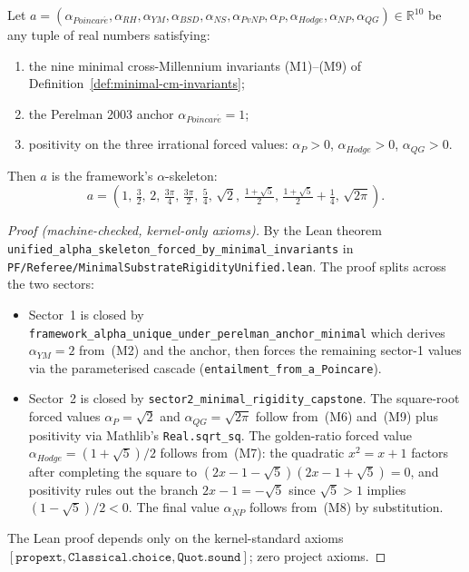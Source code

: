 \begin{theorem}
\label{thm:minimal-substrate-rigidity}
Let $a = (\alpha_{Poincar\acute{e}}, \alpha_{RH}, \alpha_{YM},
\alpha_{BSD}, \alpha_{NS}, \alpha_{PvNP}, \alpha_{P}, \alpha_{Hodge},
\alpha_{NP}, \alpha_{QG}) \in \mathbb{R}^{10}$ be any tuple of real
numbers satisfying:
\begin{enumerate}
\item the nine minimal cross-Millennium invariants
(M1)--(M9) of Definition~\ref{def:minimal-cm-invariants};
\item the Perelman 2003 anchor $\alpha_{Poincar\acute{e}} = 1$;
\item positivity on the three irrational forced values:
$\alpha_{P} > 0$, $\alpha_{Hodge} > 0$, $\alpha_{QG} > 0$.
\end{enumerate}
Then $a$ is the framework's $\alpha$-skeleton:
\[
a = \left(1,\, \tfrac{3}{2},\, 2,\, \tfrac{3\pi}{4},\, \tfrac{3\pi}{2},\,
\tfrac{5}{4},\, \sqrt{2},\, \tfrac{1+\sqrt{5}}{2},\,
\tfrac{1+\sqrt{5}}{2} + \tfrac{1}{4},\, \sqrt{2\pi}\right).
\]
\end{theorem}

\begin{proof}[Proof (machine-checked, kernel-only axioms)]
By the Lean theorem
\texttt{unified\_\allowbreak{}alpha\_\allowbreak{}skeleton\_\allowbreak{}forced\_\allowbreak{}by\_\allowbreak{}minimal\_\allowbreak{}invariants} in
\texttt{PF/\allowbreak{}Referee/\allowbreak{}Minimal\allowbreak{}Substrate\allowbreak{}Rigidity\allowbreak{}Unified.\allowbreak{}lean}. The proof
splits across the two sectors:
\begin{itemize}
\item Sector~1 is closed by
\texttt{framework\_\allowbreak{}alpha\_\allowbreak{}unique\_\allowbreak{}under\_\allowbreak{}perelman\_\allowbreak{}anchor\_\allowbreak{}minimal}
which derives $\alpha_{YM} = 2$ from~(M2) and the anchor, then forces
the remaining sector-1 values via the parameterised cascade
(\texttt{entailment\_from\_a\_Poincare}).
\item Sector~2 is closed by
\texttt{sector2\_\allowbreak{}minimal\_\allowbreak{}rigidity\_\allowbreak{}capstone}. The square-root
forced values $\alpha_{P} = \sqrt{2}$ and $\alpha_{QG} = \sqrt{2\pi}$
follow from~(M6) and~(M9) plus positivity via Mathlib's
\texttt{Real.sqrt\_sq}. The golden-ratio forced value
$\alpha_{Hodge} = (1+\sqrt{5})/2$ follows from~(M7): the quadratic
$x^{2} = x + 1$ factors after completing the square to
$(2x - 1 - \sqrt{5})(2x - 1 + \sqrt{5}) = 0$, and positivity rules
out the branch $2x - 1 = -\sqrt{5}$ since $\sqrt{5} > 1$ implies
$(1 - \sqrt{5})/2 < 0$. The final value $\alpha_{NP}$ follows
from~(M8) by substitution.
\end{itemize}
The Lean proof depends only on the kernel-standard axioms
$[\texttt{propext}, \texttt{Classical.choice}, \texttt{Quot.sound}]$;
zero project axioms.
\end{proof}

